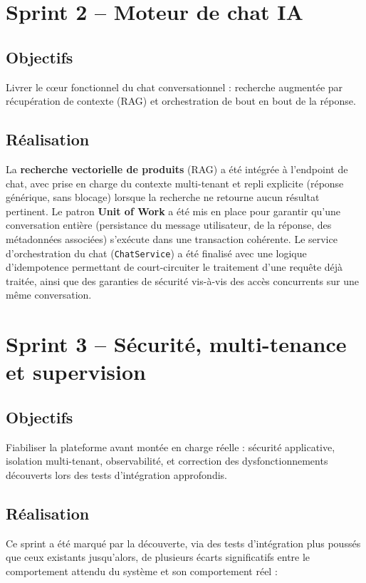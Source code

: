 \section{Sprint 2 -- Moteur de chat IA}

\subsection*{Objectifs}
Livrer le c\oe{}ur fonctionnel du chat conversationnel : recherche augmentée par récupération de contexte (RAG) et orchestration de bout en bout de la réponse.

\subsection*{Réalisation}

La \textbf{recherche vectorielle de produits} (RAG) a été intégrée à l'endpoint de chat, avec prise en charge du contexte multi-tenant et repli explicite (réponse générique, sans blocage) lorsque la recherche ne retourne aucun résultat pertinent. Le patron \textbf{Unit of Work} a été mis en place pour garantir qu'une conversation entière (persistance du message utilisateur, de la réponse, des métadonnées associées) s'exécute dans une transaction cohérente. Le service d'orchestration du chat (\texttt{ChatService}) a été finalisé avec une logique d'idempotence permettant de court-circuiter le traitement d'une requête déjà traitée, ainsi que des garanties de sécurité vis-à-vis des accès concurrents sur une même conversation.

\section{Sprint 3 -- Sécurité, multi-tenance et supervision}

\subsection*{Objectifs}
Fiabiliser la plateforme avant montée en charge réelle : sécurité applicative, isolation multi-tenant, observabilité, et correction des dysfonctionnements découverts lors des tests d'intégration approfondis.

\subsection*{Réalisation}

Ce sprint a été marqué par la découverte, via des tests d'intégration plus poussés que ceux existants jusqu'alors, de plusieurs écarts significatifs entre le comportement attendu du système et son comportement réel :

